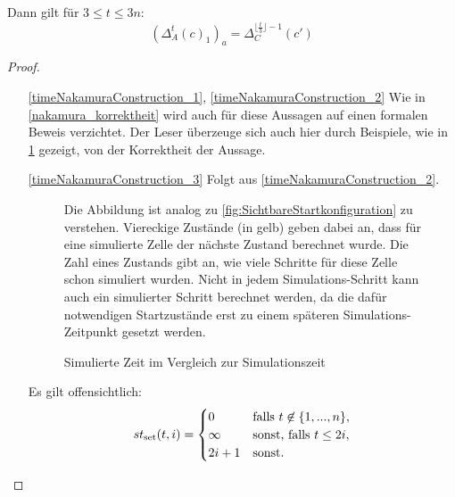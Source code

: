 \begin{satz}
\begin{enumerate}
            Dann gilt für $3 \leq t \leq 3n$:
            \[
                (\Delta^{t}_A(c)_1)_a = \Delta^{\lfloor \frac{t}{3} \rfloor - 1}_C(c')
            \]
     \end{enumerate}
\end{satz}
\begin{proof}
    \begin{itemize}
        \item[\ref{timeNakamuraConstruction_1},] %
         \ref{timeNakamuraConstruction_2}
            Wie in \cref{nakamura_korrektheit} wird auch für diese Aussagen
            auf einen formalen Beweis verzichtet. Der Leser überzeuge sich auch hier durch Beispiele,
            wie in \cref{fig:NakamuraZeit} gezeigt, von der Korrektheit der Aussage.

        \item[\ref{timeNakamuraConstruction_3}] Folgt aus \ref{timeNakamuraConstruction_2}.

            \newcommand{\nreset}{\scriptsize $\mathrm{reset}$}
            \newcommand{\setq}{\scriptsize $\mathrm{set}$}
            \begin{figure}[h!]
                \begin{center}
                
                \end{center}
                \caption{Simulierte Zeit im Vergleich zur Simulationszeit}
                \label{fig:NakamuraZeit}
                Die Abbildung ist analog zu \cref{fig:SichtbareStartkonfiguration} zu verstehen.
                Viereckige Zustände (in gelb) geben dabei an,
                dass für eine simulierte Zelle der nächste Zustand berechnet wurde.
                Die Zahl eines Zustands gibt an, wie viele Schritte für diese Zelle schon simuliert wurden.
                Nicht in jedem Simulations-Schritt kann auch ein simulierter Schritt berechnet werden,
                da die dafür notwendigen Startzustände erst zu einem späteren Simulations-Zeitpunkt gesetzt werden.
            \end{figure}
    
            Es gilt offensichtlich: 
            \[
                st_\mathrm{set}(t, i) =
                    \begin{cases}
                        0 & \text{falls } t \not\in \{ {1, ..., n} \}, \\
                        \infty & \text{sonst, falls } t \leq 2i, \\
                        2i + 1 & \text{sonst.}
                    \end{cases}
            \]
            

\end{itemize}
\end{proof}
